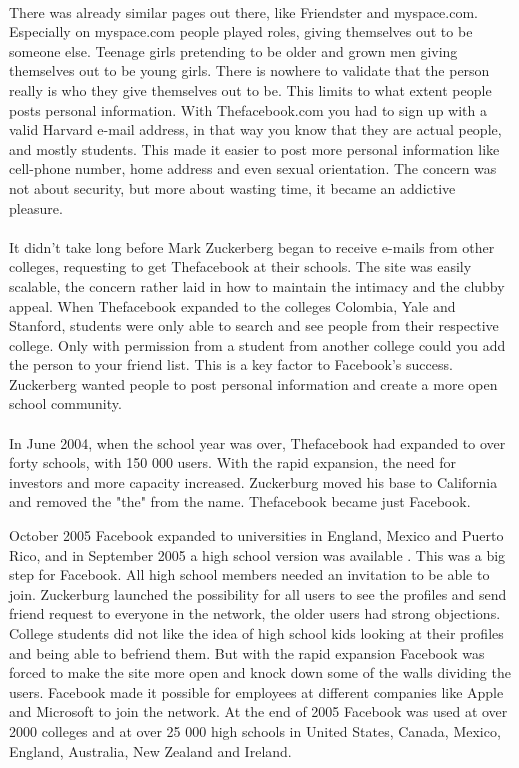 \paragraph{}
There was already similar pages out there, like Friendster and myspace.com. Especially on myspace.com people played roles, giving themselves out to be someone else. Teenage girls pretending to be older and grown men giving themselves out to be young girls. There is nowhere to validate that the person really is who they give themselves out to be. This limits to what extent people posts personal information. With Thefacebook.com you had to sign up with a valid Harvard e-mail address, in that way you know that they are actual people, and mostly students. This made it easier to post more personal information like cell-phone number, home address and even sexual orientation. The concern was not about security, but more about wasting time, it became an addictive pleasure. 

\paragraph{}
It didn't take long before Mark Zuckerberg began to receive e-mails from other colleges, requesting to get Thefacebook at their schools. The site was easily scalable, the concern rather laid in how to maintain the intimacy and the clubby appeal. When Thefacebook expanded to the colleges Colombia, Yale and Stanford, students were only able to search and see people from their respective college. Only with permission from a student from another college could you add the person to your friend list. This is a key factor to Facebook's success. Zuckerberg wanted people to post personal information and create a more open school community.

\paragraph{}
In June 2004, when the school year was over, Thefacebook had expanded to over forty schools, with 150 000 users. With the rapid expansion, the need for investors and more capacity increased. Zuckerburg moved his base to California and removed the "the" from the name. Thefacebook became just Facebook.

October 2005 Facebook expanded to universities in England, Mexico and Puerto Rico, and in September 2005 a high school version was available \cite{FacebookHistory}. This was a big step for Facebook. All high school members needed an invitation to be able to join. Zuckerburg launched the possibility for all users to see the profiles and send friend request to everyone in the network, the older users had strong objections. College students did not like the idea of high school kids looking at their profiles and being able to befriend them. But with the rapid expansion Facebook was forced to make the site more open and knock down some of the walls dividing the users. Facebook made it possible for employees at different companies like Apple and Microsoft to join the network. 
At the end of 2005 Facebook was used at over 2000 colleges and at over 25 000 high schools in United States, Canada, Mexico, England, Australia, New Zealand and Ireland. 

